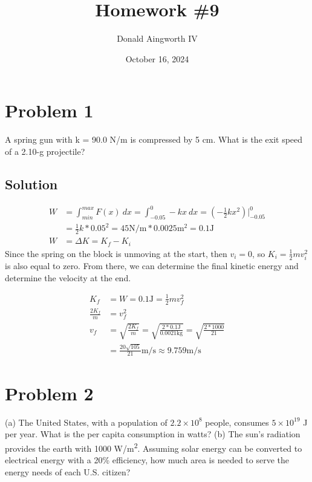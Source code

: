 \documentclass[12pt]{article}
\title{Homework \#9}
\author{Donald Aingworth IV}
\date{October 16, 2024}
\begin{document}


\section*{Problem 1}
A spring gun with k = 90.0 N/m is compressed by 5 cm. What is the exit speed of a 2.10-g projectile?

\subsection*{Solution}

\begin{align*}
    W   &= \int_{min}^{max} F(x)\ dx = \int_{-0.05}^{0} -kx\ dx = \left(-\frac{1}{2}kx^2\right)\vert_{-0.05}^{0} \\
        &= \frac{1}{2}k*0.05^2 = 45\unit{\newton/\meter} * 0.0025\unit{\meter^2} = 0.1 \unit{\joule}\\
    W   &=  \Delta K = K_f - K_i
\end{align*}
Since the spring on the block is unmoving at the start, then $v_i = 0$, so $K_i = \frac{1}{2}mv_i^2$ is also equal to zero. From there, we can determine the final kinetic energy and determine the velocity at the end.

\begin{align*}
    K_f &= W = 0.1\unit{\joule} = \frac{1}{2}mv_f^2\\
    \frac{2K_f}{m} &= v_f^2\\
    v_f &= \sqrt{\frac{2K_f}{m}} 
        = \sqrt{\frac{2*0.1\unit{\joule}}{0.0021\unit{\kilo\gram}}}
        = \sqrt{\frac{2*1000}{21}}\\
        &= \boxed{\frac{20\sqrt{105}}{21} \unit{\meter/\second} \approx 9.759 \unit{\meter/\second}}
\end{align*}

\pagebreak
\section*{Problem 2}
(a) The United States, with a population of $2.2 \times 10^8$ people, consumes $5 \times 10^{19}$ J per year. What is the per capita consumption in watts? (b) The sun's radiation provides the earth with 1000 \unit{\watt/\meter^2}. Assuming solar energy can be converted to electrical energy with a 20\% efficiency, how much area is needed to serve the energy needs of each U.S. citizen?
\end{document}
